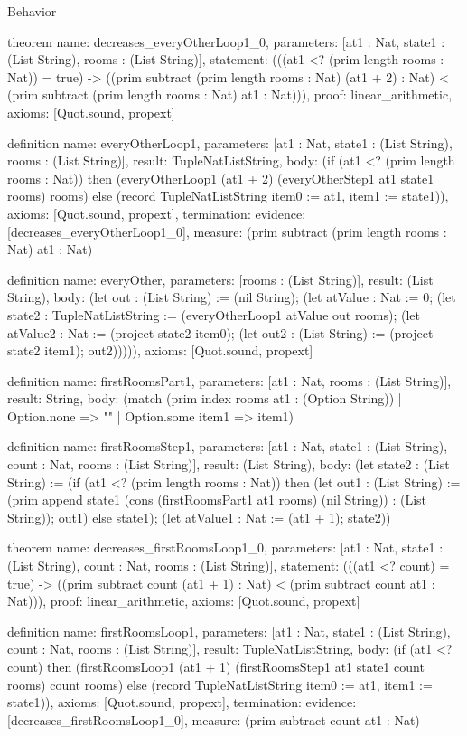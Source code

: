 \begin{lexlean}{Behavior}
\begin{semanticmodule}
theorem{
  name: decreases_everyOtherLoop1_0,
  parameters: [at1 : Nat, state1 : (List String), rooms : (List String)],
  statement: (((at1 <? (prim length rooms : Nat)) = true) -> ((prim subtract (prim length rooms : Nat) (at1 + 2) : Nat) < (prim subtract (prim length rooms : Nat) at1 : Nat))),
  proof: linear_arithmetic{},
  axioms: [Quot.sound, propext]
}

definition{
  name: everyOtherLoop1,
  parameters: [at1 : Nat, state1 : (List String), rooms : (List String)],
  result: TupleNatListString,
  body: (if (at1 <? (prim length rooms : Nat)) then (everyOtherLoop1 (at1 + 2) (everyOtherStep1 at1 state1 rooms) rooms) else (record TupleNatListString {item0 := at1, item1 := state1})),
  axioms: [Quot.sound, propext],
  termination: {
    evidence: [decreases_everyOtherLoop1_0],
    measure: (prim subtract (prim length rooms : Nat) at1 : Nat)
  }
}

definition{
  name: everyOther,
  parameters: [rooms : (List String)],
  result: (List String),
  body: (let out : (List String) := (nil String); (let atValue : Nat := 0; (let state2 : TupleNatListString := (everyOtherLoop1 atValue out rooms); (let atValue2 : Nat := (project state2 item0); (let out2 : (List String) := (project state2 item1); out2))))),
  axioms: [Quot.sound, propext]
}

definition{
  name: firstRoomsPart1,
  parameters: [at1 : Nat, rooms : (List String)],
  result: String,
  body: (match (prim index rooms at1 : (Option String))
    | Option.none => ""
    | Option.some item1 => item1)
}

definition{
  name: firstRoomsStep1,
  parameters: [at1 : Nat, state1 : (List String), count : Nat, rooms : (List String)],
  result: (List String),
  body: (let state2 : (List String) := (if (at1 <? (prim length rooms : Nat)) then (let out1 : (List String) := (prim append state1 (cons (firstRoomsPart1 at1 rooms) (nil String)) : (List String)); out1) else state1); (let atValue1 : Nat := (at1 + 1); state2))
}

theorem{
  name: decreases_firstRoomsLoop1_0,
  parameters: [at1 : Nat, state1 : (List String), count : Nat, rooms : (List String)],
  statement: (((at1 <? count) = true) -> ((prim subtract count (at1 + 1) : Nat) < (prim subtract count at1 : Nat))),
  proof: linear_arithmetic{},
  axioms: [Quot.sound, propext]
}

definition{
  name: firstRoomsLoop1,
  parameters: [at1 : Nat, state1 : (List String), count : Nat, rooms : (List String)],
  result: TupleNatListString,
  body: (if (at1 <? count) then (firstRoomsLoop1 (at1 + 1) (firstRoomsStep1 at1 state1 count rooms) count rooms) else (record TupleNatListString {item0 := at1, item1 := state1})),
  axioms: [Quot.sound, propext],
  termination: {evidence: [decreases_firstRoomsLoop1_0], measure: (prim subtract count at1 : Nat)}
}


\end{semanticmodule}
\end{lexlean}
